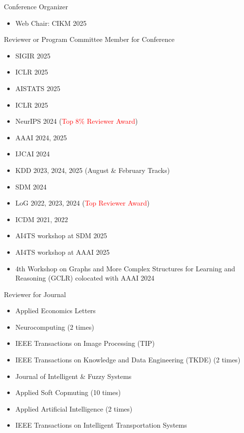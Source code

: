 \documentclass[10pt]{article}
\newenvironment{changemargin}[2]{
  \begin{list}{}{
    \setlength{\topsep}{0pt}
    \setlength{\leftmargin}{#1}
    \setlength{\rightmargin}{#2}
    \setlength{\listparindent}{\parindent}
    \setlength{\itemindent}{\parindent}
    \setlength{\parsep}{\parskip}
  }
  \item[]}{\end{list}
}
\newcommand{\RED}[1]{\textcolor{red}{#1}}
\newenvironment{body} {
	\vspace*{-16pt}
	\begin{changemargin}{-0.25in}{-0.5in}
  }
	{\end{changemargin}
}
\begin{document}
\begin{body}
	\vspace{14pt}
    Conference Organizer
    \begin{itemize}
        \item Web Chair: CIKM 2025
    \end{itemize}
   Reviewer or Program Committee Member for Conference
    \begin{itemize}
        \item SIGIR 2025
        \item ICLR 2025
        \item AISTATS 2025
        \item ICLR 2025
        \item NeurIPS 2024 (\RED{Top 8\% Reviewer Award})
        \item AAAI 2024, 2025
        \item IJCAI 2024
        \item KDD 2023, 2024, 2025 (August \& February Tracks)
        \item SDM 2024
        \item LoG 2022, 2023, 2024 (\RED{Top Reviewer Award})
        \item ICDM 2021, 2022
        \item AI4TS workshop at SDM 2025
        \item AI4TS workshop at AAAI 2025
        \item 4th Workshop on Graphs and More Complex Structures for Learning and Reasoning (GCLR) colocated with AAAI 2024
    \end{itemize}
    Reviewer for Journal
    \begin{itemize}
        \item Applied Economics Letters
        \item Neurocomputing (2 times)
        \item IEEE Transactions on Image Processing (TIP)
        \item IEEE Transactions on Knowledge and Data Engineering (TKDE) (2 times)
        \item Journal of Intelligent \& Fuzzy Systems
        \item Applied Soft Copmuting (10 times)
        \item Applied Artificial Intelligence (2 times)
        \item IEEE Transactions on Intelligent Transportation Systems
    \end{itemize}
\end{body}
\end{document}
